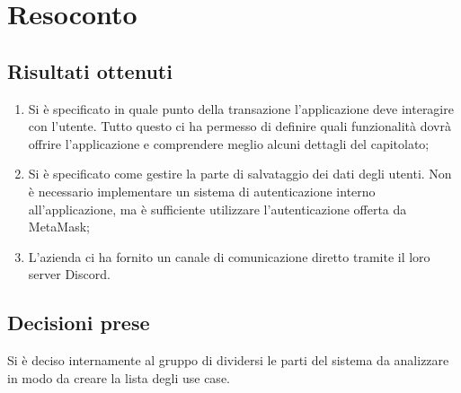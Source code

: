 \section{Resoconto}

\subsection{Risultati ottenuti}
\begin{enumerate}
    \item Si è specificato in quale punto della transazione l'applicazione deve interagire con l'utente. Tutto questo ci ha permesso di definire quali funzionalità dovrà offrire l'applicazione e comprendere meglio alcuni dettagli del capitolato;
    \item Si è specificato come gestire la parte di salvataggio dei dati degli utenti. Non è necessario implementare un sistema di autenticazione interno all'applicazione, ma è sufficiente utilizzare l'autenticazione offerta da MetaMask;
    \item L'azienda ci ha fornito un canale di comunicazione diretto tramite il loro server Discord.
\end{enumerate}

\subsection{Decisioni prese}
Si è deciso internamente al gruppo di dividersi le parti del sistema da analizzare in modo da creare la lista degli use case.